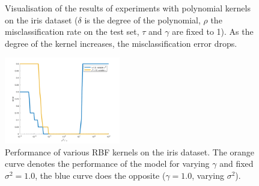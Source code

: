 \begin{figure}
\hspace*{-0.67cm} 
\centering
{}\quad
{}\quad
{}\quad
{}\quad
\caption{Visualisation of the results of experiments with polynomial kernels on the iris dataset ($\delta$ is the degree of the polynomial, $\rho$ the misclassification rate on the test set, $\tau$ and $\gamma$ are fixed to 1). As the degree of the kernel increases, the misclassification error drops.}
\label{iris}
\end{figure}

\begingroup
\setlength{\columnsep}{0.75cm}
\setlength{\intextsep}{0.2cm}
\begin{figure}
\centering
\includegraphics[width=0.45\textwidth]{../src/figures/iris/tuning}
\caption{Performance of various RBF kernels on the iris dataset. The orange curve denotes the performance of the model for varying $\gamma$ and fixed $\sigma^2=1.0$, the blue curve does the opposite ($\gamma=1.0$, varying $\sigma^2$).}
\label{iris2}
\end{figure}
\vspace{0.5cm}

